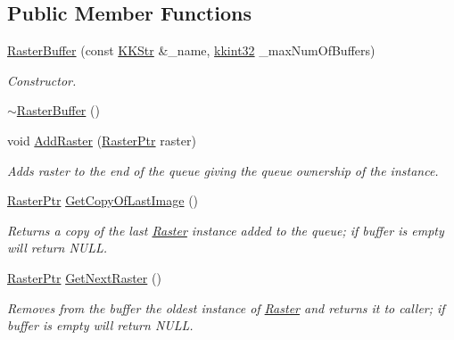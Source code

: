 \subsection*{Public Member Functions}
\begin{DoxyCompactItemize}
\item 
\hyperlink{class_k_k_b_1_1_raster_buffer_a1a11fa2be0ae025fd06f3d12b7526bf4}{Raster\+Buffer} (const \hyperlink{class_k_k_b_1_1_k_k_str}{K\+K\+Str} \&\+\_\+name, \hyperlink{namespace_k_k_b_a8fa4952cc84fda1de4bec1fbdd8d5b1b}{kkint32} \+\_\+max\+Num\+Of\+Buffers)
\begin{DoxyCompactList}\small\item\em Constructor. \end{DoxyCompactList}\item 
\hyperlink{class_k_k_b_1_1_raster_buffer_a05eabd4c27ee56fc8f4a9ba33e1a4d1d}{$\sim$\+Raster\+Buffer} ()
\item 
void \hyperlink{class_k_k_b_1_1_raster_buffer_a3dfa7abd7de9d9d045493ce127e239c1}{Add\+Raster} (\hyperlink{namespace_k_k_b_a80d46bd24db644a022c863bce8ae3633}{Raster\+Ptr} raster)
\begin{DoxyCompactList}\small\item\em Adds \textquotesingle{}raster\textquotesingle{} to the end of the queue giving the queue ownership of the instance. \end{DoxyCompactList}\item 
\hyperlink{namespace_k_k_b_a80d46bd24db644a022c863bce8ae3633}{Raster\+Ptr} \hyperlink{class_k_k_b_1_1_raster_buffer_a825746ee0a7b3bb8aeb18dd95d745d92}{Get\+Copy\+Of\+Last\+Image} ()
\begin{DoxyCompactList}\small\item\em Returns a copy of the last \hyperlink{class_k_k_b_1_1_raster}{Raster} instance added to the queue; if buffer is empty will return N\+U\+LL. \end{DoxyCompactList}\item 
\hyperlink{namespace_k_k_b_a80d46bd24db644a022c863bce8ae3633}{Raster\+Ptr} \hyperlink{class_k_k_b_1_1_raster_buffer_a0197415691c6cb7f6c4d66fb7e734db3}{Get\+Next\+Raster} ()
\begin{DoxyCompactList}\small\item\em Removes from the buffer the oldest instance of \textquotesingle{}\hyperlink{class_k_k_b_1_1_raster}{Raster}\textquotesingle{} and returns it to caller; if buffer is empty will return N\+U\+LL. \end{DoxyCompactList}\item 

\end{DoxyCompactItemize}
